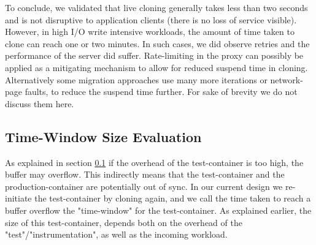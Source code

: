 To conclude, we validated that live cloning generally takes less than two seconds  and is not disruptive to application clients (there is no loss of service visible). 
However, in high I/O write intensive workloads, the amount of time taken to clone can reach one or two minutes.
In such cases, we did observe retries and the performance of the server did suffer. 
Rate-limiting in the proxy can possibly be applied as a mitigating mechanism to allow for reduced suspend time in cloning. 
Alternatively some migration approaches use many more iterations or network-page faults, to reduce the suspend time further. For sake of brevity we do not discuss them here.

\iffalse
\subsection{Time-Window Size Evaluation}
\label{sec:timewindowPerformance}

As explained in section \ref{sec:timewindowPerformance} if the overhead of the test-container is too high, the buffer may overflow.
This indirectly means that the test-container and the production-container are potentially out of sync.
In our current design we re-initiate the test-container by cloning again, and we call the time taken to reach a buffer overflow the "time-window" for the test-container.
As explained earlier, the size of this test-container, depends both on the overhead of the "test"/"instrumentation", as well as the incoming workload.

